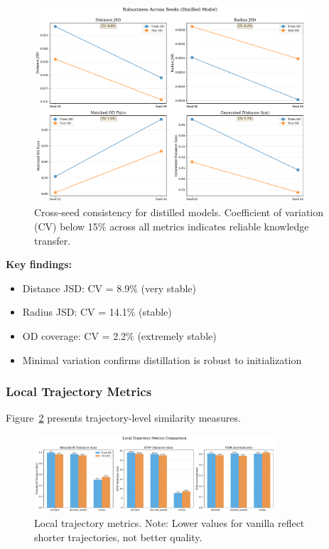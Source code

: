 \begin{figure}[h]
    \centering
    \includegraphics[width=0.9\textwidth]{assets/plots/hoser/seed_robustness.pdf}
    \caption{Cross-seed consistency for distilled models. Coefficient of variation (CV) below 15\% across all metrics indicates reliable knowledge transfer.}
    \label{fig:seed-robustness}
\end{figure}

\textbf{Key findings:}
\begin{itemize}[noitemsep,topsep=0pt]
    \item Distance JSD: CV = 8.9\% (very stable)
    \item Radius JSD: CV = 14.1\% (stable)
    \item OD coverage: CV = 2.2\% (extremely stable)
    \item Minimal variation confirms distillation is robust to initialization
\end{itemize}

\subsubsection{Local Trajectory Metrics}

Figure~\ref{fig:local-metrics} presents trajectory-level similarity measures.

\begin{figure}[h]
    \centering
    \includegraphics[width=0.8\textwidth]{assets/plots/hoser/local_metrics.pdf}
    \caption{Local trajectory metrics. Note: Lower values for vanilla reflect shorter trajectories, not better quality.}
    \label{fig:local-metrics}
\end{figure}

